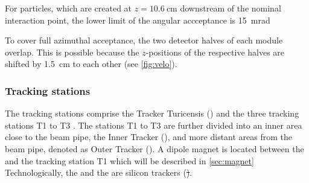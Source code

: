 For particles, which are created at $z=\SI{10.6}{\centi\metre}$ downstream of the nominal interaction point, the lower limit of the angular accceptance is \SI{15}{\milli\radian}

To cover full azimuthal acceptance, the two detector halves of each module overlap.
This is possible because the $z$-positions of the respective halves are shifted by \SI{1.5}{\centi\metre} to each other (see \cref{fig:velo}).

\subsubsection*{Tracking stations}
\label{sec:trackingStations}

The tracking stations comprise the Tracker Turicensis (\ttracker) and the three tracking stations T1 to T3 .
The stations T1 to T3 are further divided into an inner area close to the beam pipe, the Inner Tracker (\intr), and more distant areas from the beam pipe, denoted as Outer Tracker (\ot).
A dipole magnet is located between the \ttracker and the tracking station T1 which will be described in \cref{sec:magnet}
Technologically, the \ttracker and the \intr are silicon trackers (\st).

